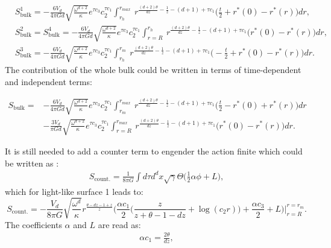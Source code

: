 \documentclass[]{article}
\begin{document}
\begin{align}
&S_{\text{bulk}}^1=-\frac{6V_d}{4\pi Gd}\sqrt{\frac{\omega^{d+2}}{\kappa}}e^{\tau c_3} c_2^{\tau c_1} \int_{r_h}^{r_{max}}  ~ r^{\frac{(d+2)\theta}{dz}-\frac{1}{z}-(d+1)+\tau c_1}\Big(\frac{t}{2}+r^*(0)-r^*(r)\Big) dr,\\
&S_{\text{bulk}}^2=S_{\text{bulk}}^4=-\frac{6V_d}{4\pi Gd}\sqrt{\frac{\omega^{d+2}}{\kappa}}e^{\tau c_3} c_2^{\tau c_1} \int_{r=R}^{r_{h}}  ~ r^{\frac{(d+2)\theta}{dz}-\frac{1}{z}-(d+1)+\tau c_1}\Big(r^*(0)-r^*(r)\Big) dr,\\
&S_{\text{bulk}}^3=-\frac{6V_d}{4\pi Gd}\sqrt{\frac{\omega^{d+2}}{\kappa}}e^{\tau c_3} c_2^{\tau c_1} \int_{r_h}^{r_{m}}  ~ r^{\frac{(d+2)\theta}{dz}-\frac{1}{z}-(d+1)+\tau c_1}\Big(-\frac{t}{2}+r^*(0)-r^*(r)\Big) dr.
\end{align}
The contribution of the whole bulk could be written in terms of time-dependent and independent terms:

\begin{equation}
\begin{aligned}
S_{\text{bulk}}=&-\frac{6V_d}{4\pi Gd}\sqrt{\frac{\omega^{d+2}}{\kappa}}e^{\tau c_3} c_2^{\tau c_1} \int_{r_m}^{r_{max}}  ~ r^{\frac{(d+2)\theta}{dz}-\frac{1}{z}-(d+1)+\tau c_1}\Big(\frac{t}{2}-r^*(0)+r^*(r)\Big) dr \\
&-\frac{3V_d}{\pi Gd}\sqrt{\frac{\omega^{d+2}}{\kappa}}e^{\tau c_3} c_2^{\tau c_1} \int_{r=R}^{r_{max}}  ~ r^{\frac{(d+2)\theta}{dz}-\frac{1}{z}-(d+1)+\tau c_1}\Big(r^*(0)-r^*(r)\Big) dr. \label{bulk}
\end{aligned}
\end{equation}


It is still needed to add a counter term to engender the action finite which could be written as \cite{alish}:
\begin{align}
S_{\text{count.}}=\frac{1}{8\pi G}\int d\tau d^dx \sqrt{\gamma} \Theta \Big(\frac{1}{2}\alpha \phi+L\Big),
\end{align}
which for light-like surface 1 leads to:
\begin{equation}
S_{\text{count.}}=-\frac{V_d}{8\pi G} \sqrt{\frac{\omega^d}{\kappa}} r^{\frac{\theta-dz-1+z}{z}}\bigg(\frac{\alpha c_1}{2}\Big(\frac{z}{z+\theta-1-dz}+\log(c_2r)\Big)+\frac{\alpha c_3}{2}+L\bigg)\Big|_{r=R}^{r=r_{m}}. \label{count}
\end{equation}
The coefficients $\alpha$ and $L$ are read as:
\begin{align}
\alpha c_1=\frac{2\theta}{dz},
\end{align}
\end{document}
